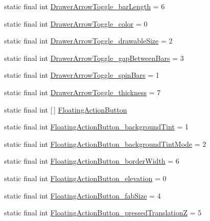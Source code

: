 \begin{DoxyCompactItemize}
\item 
static final int \hyperlink{classproject4_1_1xaria_1_1R_1_1styleable_a5812c605567372cd810d538d94b94d2f}{Drawer\+Arrow\+Toggle\+\_\+bar\+Length} = 6
\item 
static final int \hyperlink{classproject4_1_1xaria_1_1R_1_1styleable_a5ca52cb75917a6d3666d5120613e3f97}{Drawer\+Arrow\+Toggle\+\_\+color} = 0
\item 
static final int \hyperlink{classproject4_1_1xaria_1_1R_1_1styleable_a9c3f73891dd5a4d60247e34fefb8c47a}{Drawer\+Arrow\+Toggle\+\_\+drawable\+Size} = 2
\item 
static final int \hyperlink{classproject4_1_1xaria_1_1R_1_1styleable_a8d472cd739b04305b3402c6232122cb4}{Drawer\+Arrow\+Toggle\+\_\+gap\+Between\+Bars} = 3
\item 
static final int \hyperlink{classproject4_1_1xaria_1_1R_1_1styleable_a677c43a06f3156ddaadcaf41f4a5f63a}{Drawer\+Arrow\+Toggle\+\_\+spin\+Bars} = 1
\item 
static final int \hyperlink{classproject4_1_1xaria_1_1R_1_1styleable_ada3e7dfa18bdce491e278c71b0c30013}{Drawer\+Arrow\+Toggle\+\_\+thickness} = 7
\item 
static final int \mbox{[}$\,$\mbox{]} \hyperlink{classproject4_1_1xaria_1_1R_1_1styleable_afccbd80ac1ce5fd6f7a9ee0a1b546322}{Floating\+Action\+Button}
\item 
static final int \hyperlink{classproject4_1_1xaria_1_1R_1_1styleable_ab51ba534c762989e0a01ee546e7b38ce}{Floating\+Action\+Button\+\_\+background\+Tint} = 1
\item 
static final int \hyperlink{classproject4_1_1xaria_1_1R_1_1styleable_ad842e522e53bfbbcc8e47812cbc7d296}{Floating\+Action\+Button\+\_\+background\+Tint\+Mode} = 2
\item 
static final int \hyperlink{classproject4_1_1xaria_1_1R_1_1styleable_a670df91ac65db7bb060f28a69c8c2ce1}{Floating\+Action\+Button\+\_\+border\+Width} = 6
\item 
static final int \hyperlink{classproject4_1_1xaria_1_1R_1_1styleable_a1f212346344f0518ba9f7671202beaf7}{Floating\+Action\+Button\+\_\+elevation} = 0
\item 
static final int \hyperlink{classproject4_1_1xaria_1_1R_1_1styleable_a7a8737e325d68750ce13b2e494dd1c65}{Floating\+Action\+Button\+\_\+fab\+Size} = 4
\item 
static final int \hyperlink{classproject4_1_1xaria_1_1R_1_1styleable_a0017ae9170f65572e5d8c6c4077e3a32}{Floating\+Action\+Button\+\_\+pressed\+TranslationZ} = 5
\item 

\end{DoxyCompactItemize}
